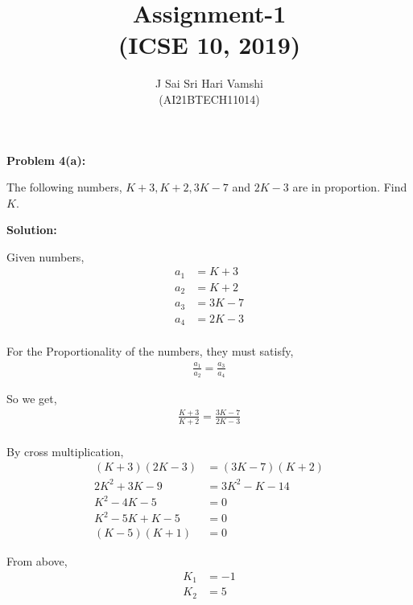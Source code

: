 \documentclass[journal,12pt,twocolumn]{article}\usepackage[margin=1.25 in]{geometry}
\title{\LARGE{\textbf{Assignment-1}\\(ICSE 10, 2019)}}
\author{\normalsize J Sai Sri Hari Vamshi\\ \footnotesize (AI21BTECH11014)}
\date{}
\begin{document}
\maketitle

\begin{center}
    \textbf{\large Problem 4(a):}
\end{center}
\noindent The following numbers, $K + 3, K + 2, 3K - 7$ and $2K - 3$ are in proportion. Find $K$.\\

\begin{center}
    \textbf{\large Solution:}
\end{center}
\noindent Given numbers,
\begin{align*}
a_1 & = K + 3\\
a_2 & = K + 2\\
a_3 & = 3K - 7\\
a_4 & = 2K - 3\\
\end{align*}

\noindent For the Proportionality of the numbers, they must satisfy,
\begin{align*}
	\frac{a_1}{a_2} = \frac{a_3}{a_4}
\end{align*}

\noindent So we get,
\begin{align*}
	\frac{K + 3}{K + 2} = \frac{3K - 7}{2K - 3}\\
\end{align*}

\noindent By cross multiplication,
\begin{align*}
    (K + 3)(2K - 3) & = (3K - 7)(K + 2)\\
    2K^2 + 3K - 9 & = 3K^2 - K - 14\\
    K^2 - 4K - 5 & = 0\\
    K^2 - 5K + K - 5 & = 0\\
    (K - 5)(K + 1) & = 0
\end{align*}

\noindent From above,
\begin{align*}
	K_1 & = -1\\
	K_2 & = 5
\end{align*}
\end{document}
